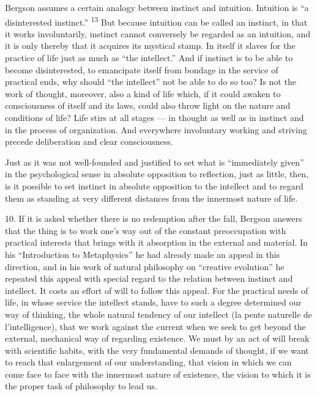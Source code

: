 \documentclass[12pt,a4paper,openany]{book}
\newcommand{\opage}[1]{\marginnote{\footnotesize\textit{[#1]}}}
\newcommand{\nm}[1]{\unskip\textsuperscript{#1}}
\begin{document}
Bergson assumes a certain analogy between instinct and intuition. Intuition is ``a disinterested instinct.'' \nm{13} But because intuition can be called an instinct, in that it works involuntarily, instinct cannot conversely be regarded as an intuition, and it is only
\opage{19}thereby that it acquires its mystical stamp. In itself it slaves for the practice of life just as much as ``the intellect.'' And if instinct is to be able to become disinterested, to emancipate itself from bondage in the service of practical ends, why should ``the intellect'' not be able to do so too? Is not the work of thought, moreover, also a kind of life which, if it could awaken to consciousness of itself and its laws, could also throw light on the nature and conditions of life? Life stirs at all stages --- in thought as well as in instinct and in the process of organization. And everywhere involuntary working and striving precede deliberation and clear consciousness.

Just as it was not well-founded and justified to set what is ``immediately given'' in the psychological sense in absolute opposition to reflection, just as little, then, is it possible to set instinct in absolute opposition to the intellect and to regard them as standing at very different distances from the innermost nature of life.

10. If it is asked whether there is no redemption after the fall, Bergson answers that the thing is to work one's way out of the constant preoccupation with practical interests that brings with it absorption in the external and material. In his ``Introduction to Metaphysics'' he had already made an appeal in this direction, and in his work of natural philosophy on ``creative evolution'' he repeated this appeal with special regard to the relation between instinct and intellect. It costs an effort of will to follow this appeal. For the practical needs of life, in whose service the intellect stands, have to such a degree determined our way of thinking, the whole natural tendency of our intellect (la pente naturelle de l'intelligence), that we work against the current when we seek to get beyond the external, mechanical way of regarding existence. We must by an act of will break with scientific habits, with the very fundamental demands of thought, if we want to reach that enlargement of our understanding, that vision in which we can come face to face with the innermost nature of existence, the vision to which it is the proper task of philosophy to lead us.
\end{document}
